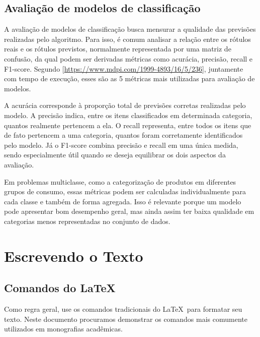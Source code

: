 \documentclass[twoside,english,brazilian]{UNISINOSmonografia}
\begin{document}
\section{Avaliação de modelos de classificação}

A avaliação de modelos de classificação busca mensurar a qualidade das previsões realizadas pelo algoritmo. Para isso, é comum analisar a relação entre os rótulos reais e os rótulos previstos, normalmente representada por uma matriz de confusão, da qual podem ser derivadas métricas como acurácia, precisão, recall e F1-score. Segundo [\url{https://www.mdpi.com/1999-4893/16/5/236}], juntamente com tempo de execução, esses são as 5 métricas mais utilizadas para avaliação de modelos.

A acurácia corresponde à proporção total de previsões corretas realizadas pelo modelo. A precisão indica, entre os itens classificados em determinada categoria, quantos realmente pertencem a ela. O recall representa, entre todos os itens que de fato pertencem a uma categoria, quantos foram corretamente identificados pelo modelo. Já o F1-score combina precisão e recall em uma única medida, sendo especialmente útil quando se deseja equilibrar os dois aspectos da avaliação.

Em problemas multiclasse, como a categorização de produtos em diferentes grupos de consumo, essas métricas podem ser calculadas individualmente para cada classe e também de forma agregada. Isso é relevante porque um modelo pode apresentar bom desempenho geral, mas ainda assim ter baixa qualidade em categorias menos representadas no conjunto de dados.











\chapter{Escrevendo o Texto}

\section{Comandos do \LaTeX}
Como regra geral, use os comandos tradicionais do \LaTeX\ para formatar seu texto.  Neste documento procuramos demonstrar os comandos mais comumente utilizados em monografias acadêmicas.
\end{document}
